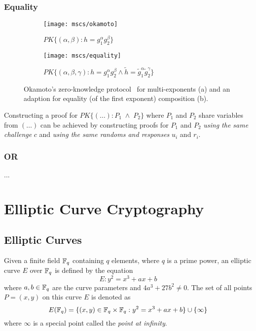 \subsubsection{Equality}

\begin{figure}
  \centering
  \begin{subfigure}[b]{0.45\textwidth}
    \texttt{[image: mscs/okamoto]}
    \caption{$PK\{(\alpha, \beta) : h = g_1^\alpha g_2^\beta \}$}
    \label{msc:okamoto}
  \end{subfigure}
  \quad
  \begin{subfigure}[b]{0.45\textwidth}
    \texttt{[image: mscs/equality]}
    \caption{$PK\{(\alpha, \beta, \gamma) : h = g_1^\alpha g_2^\beta \land \tilde{h} = \tilde{g}_1^\alpha \tilde{g}_2^\gamma\}$}
    \label{msc:equality}
  \end{subfigure}
  \caption{Okamoto's zero-knowledge protocol~\cite{Okamoto1993} for multi-exponents (a) and an adaption for equality (of the first exponent) composition (b).}
  \label{fig:okamoto}
\end{figure}

Constructing a proof for $PK\{(\dots) : P_1 \;\land\; P_2 \}$ where $P_1$ and $P_2$ share variables from $(\dots)$ can be achieved by constructing proofs for $P_1$ and $P_2$ \emph{using the same challenge} $c$ and \emph{using the same randoms and responses} $u_i$ and $r_i$.


\subsubsection{OR} ...


\section{Elliptic Curve Cryptography}

\subsection{Elliptic Curves}

\begin{definition}\label{def:elliptic_curve}
  Given a finite field $\mathbb{F}_{q}$ containing $q$ elements, where $q$ is a prime
  power, an elliptic curve $E$ over $\mathbb{F}_{q}$ is defined by the equation
  \begin{equation}\label{eqn:elliptic_curve}
    E: y^2 = x^3 + a x + b
  \end{equation}
  where $a, b \in \mathbb{F}_{q}$ are the curve parameters and $4 a^3 + 27 b^2 \neq 0$.
  The set of all points $P = (x, y)$ on this curve $E$ is denoted as
  \begin{equation*}
    E(\mathbb{F}_{q}) = \{ (x, y) \in \mathbb{F}_{q} \times \mathbb{F}_{q} : y^2 = x^3 + a x + b \}
                         \cup \{ \infty \}
  \end{equation*}
  where $\infty$ is a special point called the \emph{point at infinity}.
\end{definition}

